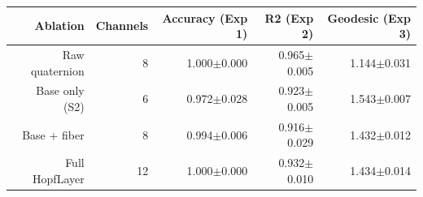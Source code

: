 \begin{tabular}{r r r r r}
\toprule
Ablation & Channels & Accuracy (Exp 1) & R2 (Exp 2) & Geodesic (Exp 3) \\
\midrule
Raw quaternion & 8 & 1.000$\pm$0.000 & 0.965$\pm$0.005 & 1.144$\pm$0.031 \\
Base only (S2) & 6 & 0.972$\pm$0.028 & 0.923$\pm$0.005 & 1.543$\pm$0.007 \\
Base + fiber & 8 & 0.994$\pm$0.006 & 0.916$\pm$0.029 & 1.432$\pm$0.012 \\
Full HopfLayer & 12 & 1.000$\pm$0.000 & 0.932$\pm$0.010 & 1.434$\pm$0.014 \\
\bottomrule
\end{tabular}
